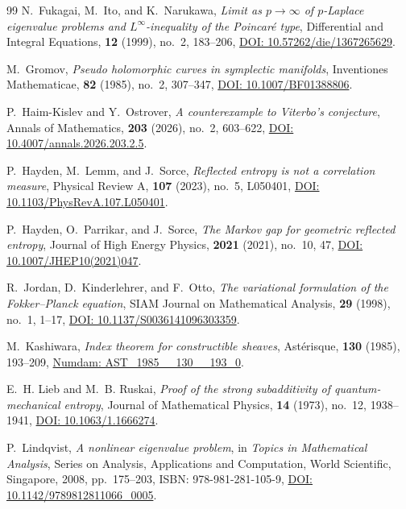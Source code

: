 \documentclass[11pt,a4paper,reqno]{amsart}
\theoremstyle{definition}
\theoremstyle{remark}
\numberwithin{equation}{section}
\begin{document}
\begin{thebibliography}{99}
N.~Fukagai, M.~Ito, and K.~Narukawa,
\emph{Limit as $p\to\infty$ of $p$-Laplace eigenvalue problems and $L^\infty$-inequality of the Poincar\'e type},
Differential and Integral Equations, \textbf{12} (1999), no.~2, 183--206,
\href{https://doi.org/10.57262/die/1367265629}{DOI: 10.57262/die/1367265629}.

M.~Gromov,
\emph{Pseudo holomorphic curves in symplectic manifolds},
Inventiones Mathematicae, \textbf{82} (1985), no.~2, 307--347,
\href{https://doi.org/10.1007/BF01388806}{DOI: 10.1007/BF01388806}.

P.~Haim-Kislev and Y.~Ostrover,
\emph{A counterexample to Viterbo's conjecture},
Annals of Mathematics, \textbf{203} (2026), no.~2, 603--622,
\href{https://doi.org/10.4007/annals.2026.203.2.5}{DOI: 10.4007/annals.2026.203.2.5}.

P.~Hayden, M.~Lemm, and J.~Sorce,
\emph{Reflected entropy is not a correlation measure},
Physical Review A, \textbf{107} (2023), no.~5, L050401,
\href{https://doi.org/10.1103/PhysRevA.107.L050401}{DOI: 10.1103/PhysRevA.107.L050401}.

P.~Hayden, O.~Parrikar, and J.~Sorce,
\emph{The Markov gap for geometric reflected entropy},
Journal of High Energy Physics, \textbf{2021} (2021), no.~10, 47,
\href{https://doi.org/10.1007/JHEP10(2021)047}{DOI: 10.1007/JHEP10(2021)047}.

R.~Jordan, D.~Kinderlehrer, and F.~Otto,
\emph{The variational formulation of the Fokker--Planck equation},
SIAM Journal on Mathematical Analysis, \textbf{29} (1998), no.~1, 1--17,
\href{https://doi.org/10.1137/S0036141096303359}{DOI: 10.1137/S0036141096303359}.

M.~Kashiwara,
\emph{Index theorem for constructible sheaves},
Ast\'erisque, \textbf{130} (1985), 193--209,
\href{http://www.numdam.org/item?id=AST_1985__130__193_0}{Numdam: AST\_1985\_\_130\_\_193\_0}.

E.~H. Lieb and M.~B. Ruskai,
\emph{Proof of the strong subadditivity of quantum-mechanical entropy},
Journal of Mathematical Physics, \textbf{14} (1973), no.~12, 1938--1941,
\href{https://doi.org/10.1063/1.1666274}{DOI: 10.1063/1.1666274}.

P.~Lindqvist,
\emph{A nonlinear eigenvalue problem},
in \emph{Topics in Mathematical Analysis}, Series on Analysis, Applications and Computation, World Scientific, Singapore, 2008, pp.~175--203,
ISBN: 978-981-281-105-9,
\href{https://doi.org/10.1142/9789812811066_0005}{DOI: 10.1142/9789812811066\_0005}.


\end{thebibliography}
\end{document}
